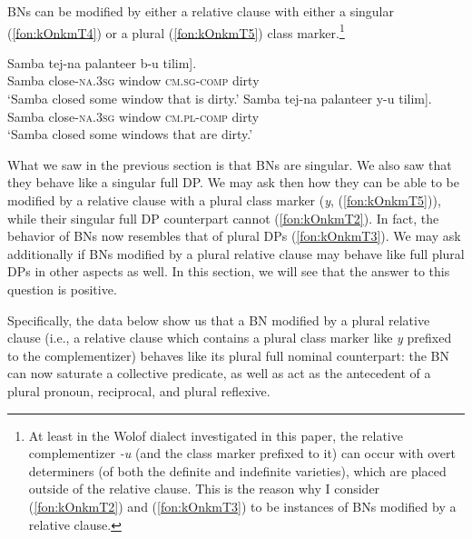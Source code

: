 \documentclass[output=paper]{langscibook}
\begin{document}
\noindent   BNs can be modified by either a relative clause with either a singular (\ref{fon:kOnkmT4}) or a plural (\ref{fon:kOnkmT5}) class marker.\footnote{At least in the Wolof dialect investigated in this paper, the relative complementizer \textit{-u} (and the class marker prefixed to it) can occur with overt determiners (of both the definite and indefinite varieties), which are placed outside of the relative clause. This is the reason why I consider (\ref{fon:kOnkmT2}) and (\ref{fon:kOnkmT3}) to be instances of BNs modified by a relative clause.}
	
	
		\ea
				\ea \gll	Samba tej-na {palanteer} \minsp{[} b-u tilim].\\
					Samba close-\textsc{na.3sg} window {} \textsc{cm.sg-comp} dirty\\
					\glt    `Samba closed some window that is dirty.'\label{fon:kOnkmT4}
				\ex \gll	Samba tej-na {palanteer} \minsp{[} y-u tilim].\\
					Samba close-\textsc{na.3sg} window {} \textsc{cm.pl-comp} dirty\\
					\glt    `Samba closed some windows that are dirty.'\label{fon:kOnkmT5}
        		\z
	    \z

	
\noindent What we saw in the previous section is that BNs are singular. We also saw that they behave like a singular full DP. We may ask then how they can be able to be modified by a relative clause with a plural class marker (\textit{y}, (\ref{fon:kOnkmT5})), while their singular full DP counterpart cannot (\ref{fon:kOnkmT2}). In fact, the behavior of BNs now resembles that of plural DPs (\ref{fon:kOnkmT3}). We may ask additionally if BNs modified by a plural relative clause may behave like full plural DPs in other aspects as well. In this section, we will see that the answer to this question is positive.

Specifically, the data below show us that a BN modified by a plural relative clause (i.e., a relative clause which contains a plural class marker like \textit{y} prefixed to the complementizer) behaves like its plural full nominal counterpart: the BN can now saturate a collective predicate, as well as act as the antecedent of a plural pronoun, reciprocal, and plural reflexive.
	
	\ea \label{fon:bNnGaThHrYoOOwl}
	    \label{fon:bNnGaThHrBOo}
					\label{fon:bNnGaThHrYoO}
			\z
		\z
		
\end{document}
